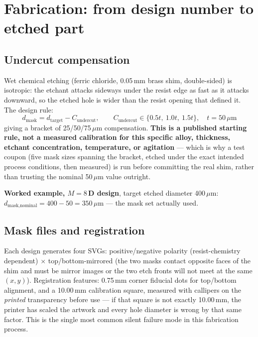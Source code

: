 \documentclass[11pt]{report}
\begin{document}
\section{Fabrication: from design number to etched part}

\subsection{Undercut compensation}

Wet chemical etching (ferric chloride, 0.05\,mm brass shim, double-sided) is isotropic: the
etchant attacks sideways under the resist edge as fast as it attacks downward, so the
etched hole is wider than the resist opening that defined it. The design rule:
\begin{equation}
d_{\text{mask}} = d_{\text{target}} - C_{\text{undercut}}, \qquad
C_{\text{undercut}} \in \{0.5t,\ 1.0t,\ 1.5t\}, \quad t=50\,\mu\text{m}
\end{equation}
giving a bracket of 25/50/75\,$\mu$m compensation. \textbf{This is a published starting
rule, not a measured calibration for this specific alloy, thickness, etchant concentration,
temperature, or agitation} --- which is why a test coupon (five mask sizes spanning the
bracket, etched under the exact intended process conditions, then measured) is run before
committing the real shim, rather than trusting the nominal 50\,$\mu$m value outright.

\textbf{Worked example, $M=8$\,D design}, target etched diameter 400\,$\mu$m:
$d_{\text{mask,nominal}} = 400 - 50 = 350\,\mu$m --- the mask set actually used.

\subsection{Mask files and registration}

Each design generates four SVGs: positive/negative polarity (resist-chemistry dependent)
$\times$ top/bottom-mirrored (the two masks contact opposite faces of the shim and must be
mirror images or the two etch fronts will not meet at the same $(x,y)$). Registration
features: 0.75\,mm corner fiducial dots for top/bottom alignment, and a 10.00\,mm
calibration square, measured with callipers on the \emph{printed} transparency before use
--- if that square is not exactly 10.00\,mm, the printer has scaled the artwork and every
hole diameter is wrong by that same factor. This is the single most common silent failure
mode in this fabrication process.
\end{document}
